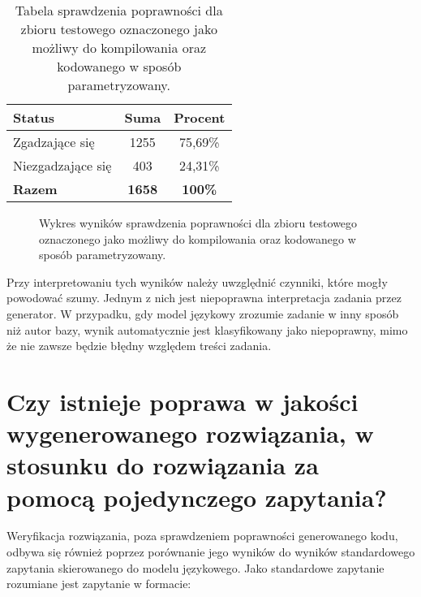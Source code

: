 \begin{table}[ht]
\caption{Tabela sprawdzenia poprawności dla zbioru testowego oznaczonego jako możliwy do kompilowania oraz kodowanego w sposób parametryzowany.}\label{tab:tabela9}
\centering%
\begin{tabular}{|l|c|c|}
\hline
\textbf{Status} & \textbf{Suma} & \textbf{Procent} \\
\hline
Zgadzające się & 1255 & 75,69\% \\
\hline
Niezgadzające się & 403 & 24,31\% \\
\hline
\textbf{Razem} & \textbf{1658} & \textbf{100\%} \\
\hline
\end{tabular}
\end{table}

\begin{figure}[H]
\centering
{}
\caption{Wykres wyników sprawdzenia poprawności dla zbioru testowego oznaczonego jako możliwy do kompilowania oraz kodowanego w sposób parametryzowany.}\label{rys:plama2i}
\end{figure}

Przy interpretowaniu tych wyników należy uwzględnić czynniki, które mogły powodować szumy. Jednym z nich jest niepoprawna interpretacja zadania przez generator. W przypadku, gdy model językowy zrozumie zadanie w inny sposób niż autor bazy, wynik automatycznie jest klasyfikowany jako niepoprawny, mimo że nie zawsze będzie błędny względem treści zadania.

\section{Czy istnieje poprawa w jakości wygenerowanego rozwiązania, w stosunku do rozwiązania za pomocą pojedynczego zapytania?}

Weryfikacja rozwiązania, poza sprawdzeniem poprawności generowanego kodu, odbywa się również poprzez porównanie jego wyników do wyników standardowego zapytania skierowanego do modelu językowego. Jako standardowe zapytanie rozumiane jest zapytanie w formacie:

